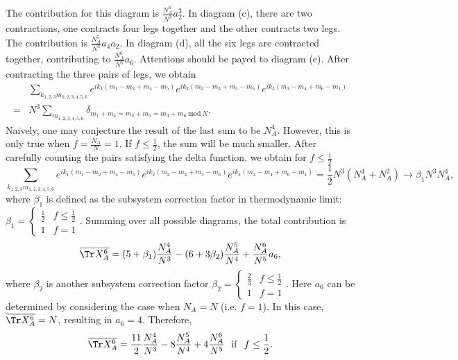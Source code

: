 The contribution for this diagram is $\frac{N_{A}^{4}}{N^{3}}a_{2}^{3}$.
In diagram (c), there are two contractions, one contracts four legs
together and the other contracts two legs. The contribution is $\frac{N_{A}^{5}}{N^{4}}a_{4}a_{2}$.
In diagram (d), all the six legs are contracted together, contributing
to $\frac{N_{A}^{6}}{N^{5}}a_{6}$. Attentions should be payed to %
diagram (e). After contracting the three pairs of legs, we obtain
\begin{equation}
\begin{split} & \sum_{k_{1,2,3}m_{1,2,3,4,5,6}}e^{ik_{1}(m_{1}-m_{2}+m_{4}-m_{5})}e^{ik_{2}(m_{2}-m_{3}+m_{5}-m_{6})}e^{ik_{3}(m_{3}-m_{4}+m_{6}-m_{1})}\\
= & N^{3}\sum_{m_{1,2,3,4,5,6}}\delta_{m_{1}+m_{4}=m_{2}+m_{5}=m_{3}+m_{6}\ \mathrm{mod\ }N}.
\end{split}
\end{equation}
Naively, one may conjecture %
the result of the last sum to %
be $N_{A}^{4}$.
However, this is only true when $f=\frac{N_{A}}{N}=1$. If $f\leq\frac{1}{2}$,
the sum will be much smaller. After carefully counting the pairs satisfying
the delta function, we obtain for $f\leq\frac{1}{2}$
\begin{equation}
\sum_{k_{1,2,3}m_{1,2,3,4,5,6}}e^{ik_{1}(m_{1}-m_{2}+m_{4}-m_{5})}e^{ik_{2}(m_{2}-m_{3}+m_{5}-m_{6})}e^{ik_{3}(m_{3}-m_{4}+m_{6}-m_{1})}=\frac{1}{2}N^{3}(N_{A}^{4}+N_{A}^{2})\to\beta_{1}N^{3}N_{A}^{4},
\end{equation}
where $\beta_{1}$ is defined as the subsystem correction factor in
thermodynamic limit: $\beta_{1}=\begin{cases}
\frac{1}{2} & f\leq\frac{1}{2}\\
1 & f=1
\end{cases}$. Summing over all possible diagrams, the total contribution is 
\begin{equation}
\overline{\Tr X_{A}^{6}}=(5+\beta_{1})\frac{N_{A}^{4}}{N^{3}}-(6+3\beta_{2})\frac{N_{A}^{5}}{N^{4}}+\frac{N_{A}^{6}}{N^{5}}a_{6},
\end{equation}
where $\beta_{2}$ is another subsystem correction factor $\beta_{2}=\begin{cases}
\frac{2}{3} & f\leq\frac{1}{2}\\
1 & f=1
\end{cases}$. Here $a_{6}$ can be determined by considering the case when $N_{A}=N$
(i.e. $f=1$). In this case, $\overline{\Tr X_{A}^{6}}=N$, resulting
in $a_{6}=4$. Therefore, 
\begin{equation}
\overline{\Tr X_{A}^{6}}=\frac{11}{2}\frac{N_{A}^{4}}{N^{3}}-8\frac{N_{A}^{5}}{N^{4}}+4\frac{N_{A}^{6}}{N^{5}}\ \ \mathrm{if}\ \ f\leq\frac{1}{2}.
\end{equation}


